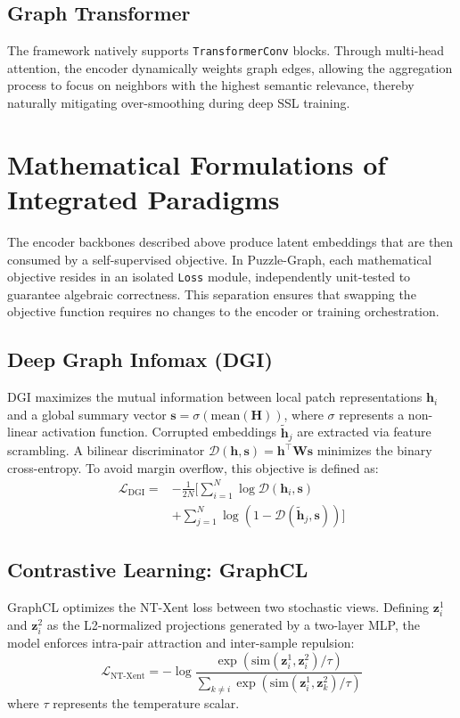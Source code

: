 \documentclass[conference]{IEEEtran}
\begin{document}
\subsection{Graph Transformer}
The framework natively supports \texttt{TransformerConv} blocks. Through multi-head attention, the encoder dynamically weights graph edges, allowing the aggregation process to focus on neighbors with the highest semantic relevance, thereby naturally mitigating over-smoothing during deep SSL training.

\section{Mathematical Formulations of Integrated Paradigms}
The encoder backbones described above produce latent embeddings that are then consumed by a self-supervised objective. In Puzzle-Graph, each mathematical objective resides in an isolated \texttt{Loss} module, independently unit-tested to guarantee algebraic correctness. This separation ensures that swapping the objective function requires no changes to the encoder or training orchestration.

\subsection{Deep Graph Infomax (DGI)}
DGI \cite{dgi} maximizes the mutual information between local patch representations $\bm{h}_i$ and a global summary vector $\bm{s} = \sigma(\text{mean}(\bm{H}))$, where $\sigma$ represents a non-linear activation function. Corrupted embeddings $\tilde{\bm{h}}_j$ are extracted via feature scrambling. A bilinear discriminator $\mathcal{D}(\bm{h}, \bm{s}) = \bm{h}^\top \bm{W} \bm{s}$ minimizes the binary cross-entropy. To avoid margin overflow, this objective is defined as:
\begin{equation}
\begin{split}
\mathcal{L}_{\text{DGI}} = &-\frac{1}{2N} \Bigg[ \sum_{i=1}^{N} \log \mathcal{D}(\bm{h}_i, \bm{s}) \\
&+ \sum_{j=1}^{N} \log (1 - \mathcal{D}(\tilde{\bm{h}}_j, \bm{s})) \Bigg]
\end{split}
\end{equation}

\subsection{Contrastive Learning: GraphCL}
GraphCL \cite{graphcl} optimizes the NT-Xent loss between two stochastic views. Defining $\bm{z}_i^1$ and $\bm{z}_i^2$ as the L2-normalized projections generated by a two-layer MLP, the model enforces intra-pair attraction and inter-sample repulsion:
\begin{equation}
\mathcal{L}_{\text{NT-Xent}} = -\log \frac{\exp(\text{sim}(\bm{z}_i^1, \bm{z}_i^2)/\tau)}{\sum_{k \neq i} \exp(\text{sim}(\bm{z}_i^1, \bm{z}_k^2)/\tau)}
\end{equation}
where $\tau$ represents the temperature scalar.
\end{document}
